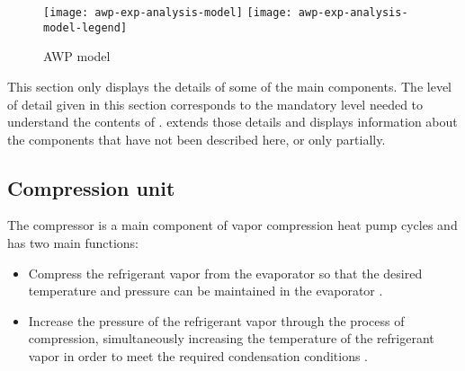 \begin{figure}[htbp]
  \centering
  \texttt{[image: awp-exp-analysis-model]}
  \texttt{[image: awp-exp-analysis-model-legend]}
  \caption[AWP model]{AWP model}
  \label{fig:awp-exp-analysis-model}
\end{figure}


This section only displays the details of some of the \AWP{} main
components. The level of detail given in this section corresponds to
the mandatory level needed to understand the contents of
. 
extends those details and displays information about the components
that have not been described here, or only partially.

\subsection{Compression unit}
\label{sec:awp-cp-unit}

The compressor is a main component of vapor compression heat pump
cycles and has two main functions:

\begin{itemize}
\item Compress the refrigerant vapor from the evaporator so that the
  desired temperature and pressure can be maintained in the evaporator
  \citep[p.\,109]{dincer-kanoglu-2010a}.
\item Increase the pressure of the refrigerant vapor through the
  process of compression, simultaneously increasing the temperature of
  the refrigerant vapor \citep[p.\,109]{dincer-kanoglu-2010a} in order
  to meet the required condensation conditions
  \citep{rapin-desmons-2011a}.
\end{itemize}

